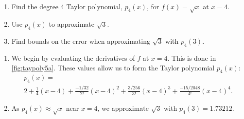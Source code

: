 \begin{example}\label{ex_taypoly5}
\mbox{}\\[-2\baselineskip]\parbox[t]{\linewidth}{\begin{enumerate}
	\item	Find the degree 4 Taylor polynomial, $p_4(x)$, for $f(x)=\sqrt{x}$ at $x=4.$
	\item	Use $p_4(x)$ to approximate $\sqrt{3}$.
	\item	Find bounds on the error when approximating $\sqrt{3}$ with $p_4(3)$.
\end{enumerate}}\vspace{0pt}
\solution
\begin{enumerate}
	\item	We begin by evaluating the derivatives of $f$ at $x=4$. This is done in \autoref{fig:taypoly5a}. These values allow us to form the Taylor polynomial $p_4(x)$:
%
\begin{multline*}
p_4(x) = \\
2 + \frac14(x-4) +\frac{-1/32}{2!}(x-4)^2+\frac{3/256}{3!}(x-4)^3+\frac{-15/2048}{4!}(x-4)^4.
\end{multline*}

	\item	As $p_4(x) \approx \sqrt{x}$ near $x=4$, we approximate $\sqrt{3}$ with $p_4(3) = 1.73212$.


\end{enumerate}
\end{example}
